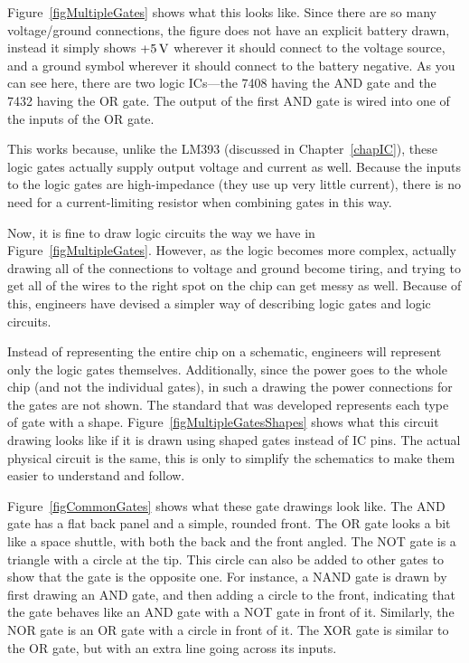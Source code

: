 Figure~\ref{figMultipleGates} shows what this looks like.
Since there are so many voltage/ground connections, the figure does not have an explicit battery drawn, instead it simply shows $+5\,\si{\volt}$ wherever it should connect to the voltage source, and a ground symbol wherever it should connect to the battery negative.
As you can see here, there are two logic ICs---the 7408 having the AND gate and the 7432 having the OR gate.
The output of the first AND gate is wired into one of the inputs of the OR gate.

This works because, unlike the LM393 (discussed in Chapter~\ref{chapIC}), these logic gates actually supply output voltage and current as well.  
Because the inputs to the logic gates are high-impedance (they use up very little current), there is no need for a current-limiting resistor when combining gates in this way.

Now, it is fine to draw logic circuits the way we have in Figure~\ref{figMultipleGates}.
However, as the logic becomes more complex, actually drawing all of the connections to voltage and ground become tiring, and trying to get all of the wires to the right spot on the chip can get messy as well.
Because of this, engineers have devised a simpler way of describing logic gates and logic circuits.


Instead of representing the entire chip on a schematic, engineers will represent only the logic gates themselves.
Additionally, since the power goes to the whole chip (and not the individual gates), in such a drawing the power connections for the gates are not shown.
The standard that was developed represents each type of gate with a shape.
Figure~\ref{figMultipleGatesShapes} shows what this circuit drawing looks like if it is drawn using shaped gates instead of IC pins.
The actual physical circuit is the same, this is only to simplify the schematics to make them easier to understand and follow.


Figure~\ref{figCommonGates} shows what these gate drawings look like.
The AND gate has a flat back panel and a simple, rounded front.
The OR gate looks a bit like a space shuttle, with both the back and the front angled.
The NOT gate is a triangle with a circle at the tip.
This circle can also be added to other gates to show that the gate is the opposite one.
For instance, a NAND gate is drawn by first drawing an AND gate, and then adding a circle to the front, indicating that the gate behaves like an AND gate with a NOT gate in front of it.
Similarly, the NOR gate is an OR gate with a circle in front of it.
The XOR gate is similar to the OR gate, but with an extra line going across its inputs.

